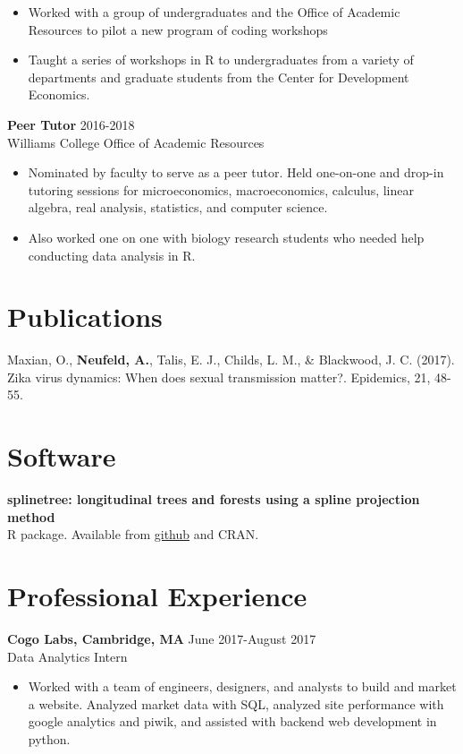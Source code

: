 \documentclass[margin, 10pt]{res} %
\begin{document}
\begin{resume}
{\begin{itemize}
\item Worked with a group of undergraduates and the Office of Academic Resources to pilot a new program of coding workshops
\item Taught a series of workshops in R to undergraduates from a variety of departments and graduate students from the Center for Development Economics. 
\end{itemize}
{\textbf{Peer Tutor}} \hfill 2016-2018 \\
Williams College Office of Academic Resources
\begin{itemize}
\item Nominated by faculty to serve as a peer tutor. Held one-on-one and drop-in tutoring sessions for microeconomics, macroeconomics, calculus, linear algebra, real analysis, statistics, and computer science. 
\item Also worked one on one with biology research students who needed help conducting data analysis in R. 
\end{itemize}


\section{Publications} 
Maxian, O., \textbf{Neufeld, A.}, Talis, E. J., Childs, L. M., \& Blackwood, J. C. (2017). Zika virus dynamics: When does sexual transmission matter?. Epidemics, 21, 48-55.

 
\section{Software} 
\textbf{splinetree: longitudinal trees and forests using a spline projection method} \\
R package. Available from \href{https://github.com/anna-neufeld/splinetree}{github} and CRAN. 

\section{Professional Experience}
{\textbf{Cogo Labs, Cambridge, MA}} \hfill June 2017-August 2017 \\
Data Analytics Intern
\begin{itemize}
\item Worked with a team of engineers, designers, and analysts to build and market a website. Analyzed market data with SQL, analyzed site performance with google analytics and piwik, and assisted with backend web development in python. 
\end{itemize}

}
\end{resume}
\end{document}
